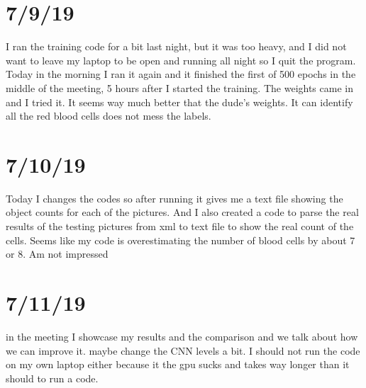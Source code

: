 \documentclass{article}
\begin{document}
\section{7/9/19}
I ran the training code for a bit last night, but it was too heavy, and I did not want to leave my laptop to be open and running all night so I quit the program. Today in the morning I ran it again and it finished the first of 500 epochs in the middle of the meeting, 5 hours after I started the training. The weights came in and I tried it. It seems way much better that the dude’s weights. It can identify all the red blood cells does not mess the labels.

\section{7/10/19}
Today I changes the codes so after running it gives me a text file showing the object counts for each of the pictures. And I also created a code to parse the real results of the testing pictures from xml to text file to show the real count of the cells. Seems like my code is overestimating the number of blood cells by about 7 or 8. Am not impressed

\section{7/11/19}
in the meeting I showcase my results and the comparison and we talk about how we can improve it. maybe change the CNN levels a bit. I should not run the code on my own laptop either because it the gpu sucks and takes way longer than it should to run a code.
\end{document}
